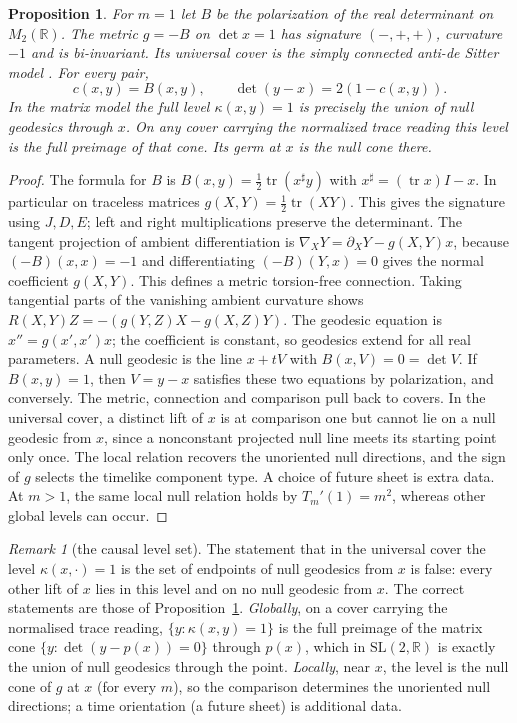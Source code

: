 \documentclass[11pt,reqno]{amsart}
\newtheorem{proposition}[theorem]{Proposition}
\theoremstyle{definition}
\theoremstyle{remark}
\newtheorem{remark}[theorem]{Remark}
\numberwithin{equation}{section}
\newcommand{\R}{\mathbb{R}}
\begin{document}
\begin{proposition}\label{m3:ads}
For \(m=1\) let \(B\) be the polarization of the real determinant on
\(M_2(\R)\). The metric \(g=-B\) on \(\det x=1\) has signature
\((-,+,+)\), curvature \(-1\) and is bi-invariant. Its universal cover is
the simply connected anti-de Sitter model \cite{m3ONeill}.
For every pair,
\[
 c(x,y)=B(x,y),\qquad \det(y-x)=2(1-c(x,y)).
\]
In the matrix model the full level \(\kappa(x,y)=1\) is precisely the
union of null geodesics through \(x\). On any cover carrying the
normalized trace reading this level is the full preimage of that cone.
Its germ at \(x\) is the null cone there.
\end{proposition}
\begin{proof}
The formula for \(B\) is \(B(x,y)=\tfrac12\operatorname{tr}(x^\sharp y)\)
with \(x^\sharp=(\operatorname{tr}x)I-x\). In particular on traceless
matrices \(g(X,Y)=\tfrac12\operatorname{tr}(XY)\). This gives the
signature using \(J,D,E\); left and right multiplications preserve the
determinant. The tangent projection of ambient differentiation is
\(\nabla_XY=\partial_XY-g(X,Y)x\), because
\((-B)(x,x)=-1\) and differentiating \((-B)(Y,x)=0\) gives the normal
coefficient \(g(X,Y)\). This defines a metric torsion-free connection.
Taking tangential parts of the vanishing ambient curvature shows
\(R(X,Y)Z=-(g(Y,Z)X-g(X,Z)Y)\).
The geodesic equation is \(x''=g(x',x')x\); the coefficient is constant,
so geodesics extend for all real parameters. A null geodesic is the line
\(x+tV\) with \(B(x,V)=0=\det V\). If \(B(x,y)=1\), then
\(V=y-x\) satisfies these two equations by polarization, and conversely.
The metric, connection and comparison pull back to covers. In the universal
cover, a distinct lift of \(x\) is at comparison one but cannot lie on a
null geodesic from \(x\), since a nonconstant projected null line meets
its starting point only once. The local relation recovers the unoriented
null directions, and the sign of \(g\) selects the timelike component
type. A choice of future sheet is extra data. At \(m>1\), the same local
null relation holds by \(T_m'(1)=m^2\), whereas other global levels can occur.
\end{proof}

\begin{remark}[the causal level set]\label{m3:causal}
The statement that in the universal cover the level $\kappa(x,\cdot)=1$ is the set of endpoints of null geodesics from $x$ is false: every
other lift of $x$ lies in this level and on no null geodesic from $x$.  The correct statements are those of Proposition~\ref{m3:ads}.
\emph{Globally}, on a cover carrying the normalised trace reading, $\{y:\kappa(x,y)=1\}$ is the full preimage of the matrix cone
$\{y:\det(y-p(x))=0\}$ through $p(x)$, which in $\mathrm{SL}(2,\R)$ is exactly the union of null geodesics through the point.
\emph{Locally}, near $x$, the level is the null cone of $g$ at $x$ (for every $m$), so the comparison determines the unoriented null
directions; a time orientation (a future sheet) is additional data.
\end{remark}
\end{document}
